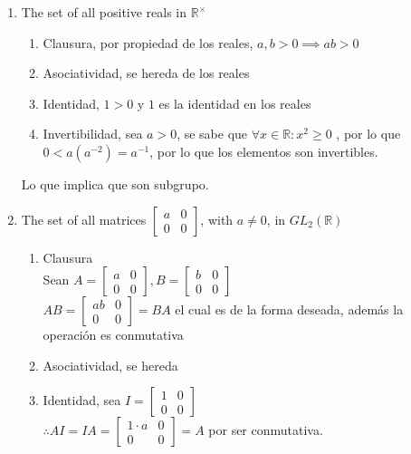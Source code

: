 \documentclass[11pt]{article}
\begin{document}
\begin{enumerate}[label=(\alph*)]
	\item The set of all positive reals in $\mathbb{R}^\times$
	\begin{enumerate}[label=\arabic*.]
		\item Clausura, por propiedad de los reales, $a,b>0\implies ab>0$
		
		\item Asociatividad, se hereda de los reales
		
		\item Identidad, $1>0$ y $1$ es la identidad en los reales
		
		\item Invertibilidad, sea $a>0$, se sabe que $\forall x\in\mathbb{R}:x^2\geq 0$ , por lo que $0<a(a^{-2})=a^{-1}$, por lo que los elementos son invertibles.
	\end{enumerate}
	Lo que implica que son subgrupo.
	
	\item The set of all matrices $\begin{bmatrix} a & 0\\ 0 & 0 \end{bmatrix}$, with $a\neq 0$, in $GL_2(\mathbb{R})$
	\begin{enumerate}[label=\arabic*.]
		\item Clausura\\
		Sean $A=\begin{bmatrix} a & 0 \\ 0 & 0 \end{bmatrix}, B=\begin{bmatrix} b & 0 \\ 0 & 0 \end{bmatrix}$\\
		$AB=\begin{bmatrix} ab & 0 \\ 0 & 0 \end{bmatrix}=BA$ el cual es de la forma deseada, además la operación es conmutativa\\
		
		\item Asociatividad, se hereda
		
		\item Identidad, sea $I=\begin{bmatrix} 1 & 0 \\ 0 & 0 \end{bmatrix}$\\
		$\therefore AI=IA=\begin{bmatrix} 1\cdot a & 0 \\ 0 & 0 \end{bmatrix}=A$ por ser conmutativa.
		

\end{enumerate}
\end{enumerate}
\end{document}
